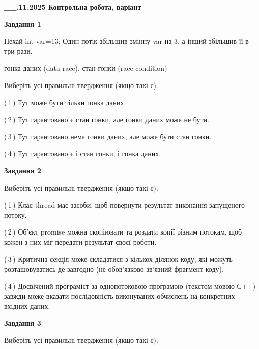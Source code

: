 \documentclass[12pt, ukrainian]{article}
\begin{document}
\begin {large}

\textbf{\_\_.11.2025 Контрольна робота, варіант  }\par


{

\begin{center}
\textbf{Завдання 1}
\end{center}
Нехай int var=13; Один потік збільшив змінну var на 3, а інший збільшив її в три рази.

гонка даних (data race), стан гонки (race condition)

Виберіть усі правильні твердження (якщо такі є).\par
\vspace{2mm}
(\,1\,) Тут може бути тільки гонка даних.%

(\,2\,) Тут гарантовано є стан гонки, але гонки даних може не бути.%

(\,3\,) Тут гарантовано нема гонки даних, але може бути стан гонки.%

(\,4\,) Тут гарантовано є і стан гонки, і гонка даних.%



\begin{center}
\textbf{Завдання 2}
\end{center}
Виберіть усі правильні твердження (якщо такі є).\par
\vspace{2mm}

(\,1\,) Клас thread має засоби, щоб повернути результат виконання запущеного потоку.%

(\,2\,) Об’єкт promise можна скопіювати та роздати копії різним потокам, щоб кожен з них міг передати результат своєї роботи.%

(\,3\,) Критична секція може складатися з кількох ділянок коду, які можуть розташовуватись де завгодно (не обов’язково зв’язний фрагмент коду).%

(\,4\,) Досвічений програміст за однопотоковою програмою (текстом мовою С++) завжди може вказати послідовність виконуваних обчислень на конкретних вхідних даних.%



\begin{center}
\textbf{Завдання 3}
\end{center}
Виберіть усі правильні твердження (якщо такі є).\par
\vspace{2mm}

}
\end{large}
\end{document}
